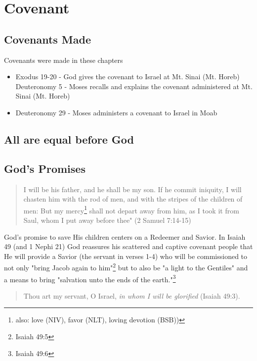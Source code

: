 \chapter{Covenant}

\section{Covenants Made}

Covenants were made in these chapters
\begin{itemize}
  \item Exodus 19-20 - God gives the covenant to Israel at Mt. Sinai (Mt. Horeb)
  \subitem Deuteronomy 5 - Moses recalls and explains the covenant administered at Mt. Sinai (Mt. Horeb)
  \item Deuteronomy 29 - Moses administers a covenant to Israel in Moab
\end{itemize}

\section{All are equal before God}

\section{God's Promises}

\begin{quotation}
I will be his father, and he shall be my son. If he commit iniquity, I will chasten him with the rod of men, and with the stripes of the children of men: But my mercy\footnote{also: love (NIV), favor (NLT), loving devotion (BSB))} shall not depart away from him, as I took it from Saul, whom I put away before thee" (2 Samuel 7:14-15)
\end{quotation}

God's promise to save His children centers on a Redeemer and Savior. In Isaiah 49 (and 1 Nephi 21) God reassures his scattered and captive covenant people that He will provide a Savior (the servant in verses 1-4) who will be commissioned to not only "bring Jacob again to him"\footnote{Isaiah 49:5} but to also be "a light to the Gentiles" and a means to bring "salvation unto the ends of the earth."\footnote{Isaiah 49:6}

\begin{quotation}
Thou art my servant, O Israel, \textit{in whom I will be glorified} (Isaiah 49:3).
\end{quotation}

